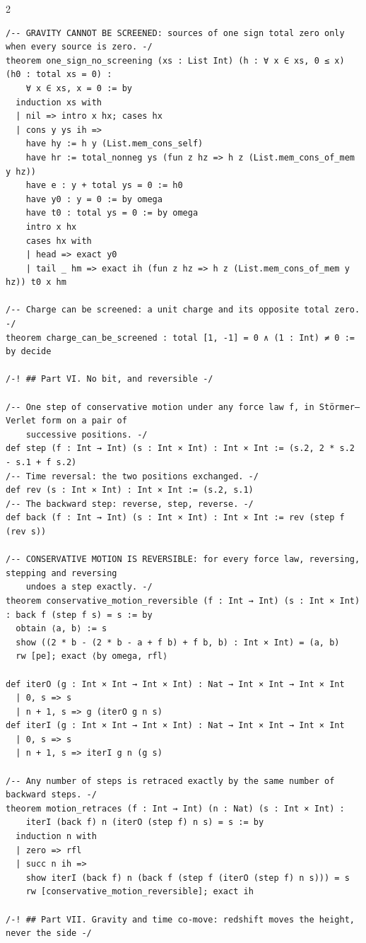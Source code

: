 \documentclass[10pt]{article}
\begin{document}
\begin{multicols}{2}
\begin{Verbatim}[fontsize=\fontsize{5.9}{6.8}\selectfont,breaklines,breakanywhere,breaksymbolleft={}]
/-- GRAVITY CANNOT BE SCREENED: sources of one sign total zero only when every source is zero. -/
theorem one_sign_no_screening (xs : List Int) (h : ∀ x ∈ xs, 0 ≤ x) (h0 : total xs = 0) :
    ∀ x ∈ xs, x = 0 := by
  induction xs with
  | nil => intro x hx; cases hx
  | cons y ys ih =>
    have hy := h y (List.mem_cons_self)
    have hr := total_nonneg ys (fun z hz => h z (List.mem_cons_of_mem y hz))
    have e : y + total ys = 0 := h0
    have y0 : y = 0 := by omega
    have t0 : total ys = 0 := by omega
    intro x hx
    cases hx with
    | head => exact y0
    | tail _ hm => exact ih (fun z hz => h z (List.mem_cons_of_mem y hz)) t0 x hm

/-- Charge can be screened: a unit charge and its opposite total zero. -/
theorem charge_can_be_screened : total [1, -1] = 0 ∧ (1 : Int) ≠ 0 := by decide

/-! ## Part VI. No bit, and reversible -/

/-- One step of conservative motion under any force law f, in Störmer–Verlet form on a pair of
    successive positions. -/
def step (f : Int → Int) (s : Int × Int) : Int × Int := (s.2, 2 * s.2 - s.1 + f s.2)
/-- Time reversal: the two positions exchanged. -/
def rev (s : Int × Int) : Int × Int := (s.2, s.1)
/-- The backward step: reverse, step, reverse. -/
def back (f : Int → Int) (s : Int × Int) : Int × Int := rev (step f (rev s))

/-- CONSERVATIVE MOTION IS REVERSIBLE: for every force law, reversing, stepping and reversing
    undoes a step exactly. -/
theorem conservative_motion_reversible (f : Int → Int) (s : Int × Int) : back f (step f s) = s := by
  obtain ⟨a, b⟩ := s
  show ((2 * b - (2 * b - a + f b) + f b, b) : Int × Int) = (a, b)
  rw [pe]; exact ⟨by omega, rfl⟩

def iterO (g : Int × Int → Int × Int) : Nat → Int × Int → Int × Int
  | 0, s => s
  | n + 1, s => g (iterO g n s)
def iterI (g : Int × Int → Int × Int) : Nat → Int × Int → Int × Int
  | 0, s => s
  | n + 1, s => iterI g n (g s)

/-- Any number of steps is retraced exactly by the same number of backward steps. -/
theorem motion_retraces (f : Int → Int) (n : Nat) (s : Int × Int) :
    iterI (back f) n (iterO (step f) n s) = s := by
  induction n with
  | zero => rfl
  | succ n ih =>
    show iterI (back f) n (back f (step f (iterO (step f) n s))) = s
    rw [conservative_motion_reversible]; exact ih

/-! ## Part VII. Gravity and time co-move: redshift moves the height, never the side -/


\end{Verbatim}
\end{multicols}
\end{document}

